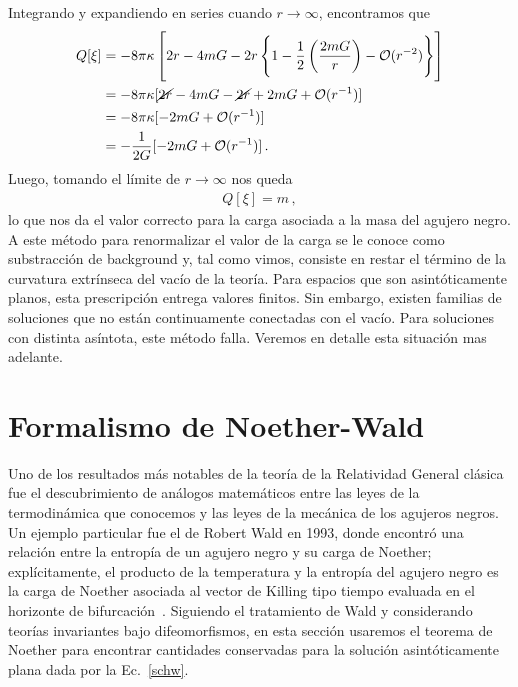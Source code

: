\documentclass[../Main.tex]{subfiles}
\begin{document}
Integrando y expandiendo en series cuando $r\to\infty$, encontramos que
\begin{align} \notag
    Q[\xi]&=-8\pi\kappa\left[2r-4mG-2r\left\{1-\frac{1}{2}\left(\frac{2mG}{r}\right)-\mathcal{O}(r^{-2})\right\}\right]\\ \notag
    &=-8\pi\kappa[\cancel{2r}-4mG-\cancel{2r}+2mG+\mathcal{O}(r^{-1})]\\ \notag
    &=-8\pi\kappa[-2mG+\mathcal{O}(r^{-1})]\\
    &=-\frac{1}{2G}[-2mG+\mathcal{O}(r^{-1})]\, .
\end{align}
Luego, tomando el límite de $r\to\infty$ nos queda 
\begin{align}
    Q[\xi]=m\, ,
\end{align}
lo que nos da el valor correcto para la carga asociada a la masa del agujero negro. A este método para renormalizar el valor de la carga se le conoce como substracción de background y, tal como vimos, consiste en restar el término de la curvatura extrínseca del vacío de la teoría. Para espacios que son asintóticamente planos, esta prescripción entrega valores finitos. Sin embargo, existen familias de soluciones que no están continuamente conectadas con el vacío. Para soluciones con distinta asíntota, este método falla. Veremos en detalle esta situación mas adelante. 

\section{Formalismo de Noether-Wald \label{sec:NW}}

Uno de los resultados más notables de la teoría de la Relatividad General clásica fue el descubrimiento de análogos matemáticos entre las leyes de la termodinámica que conocemos y las leyes de la mecánica de los agujeros negros. Un ejemplo particular fue el de Robert Wald en 1993, donde encontró una relación entre la entropía  de un agujero negro y su carga de Noether; explícitamente, el producto de la temperatura y la entropía del agujero negro es la carga de Noether asociada al vector de Killing tipo tiempo evaluada en el horizonte de bifurcación~\cite{Wald:1993nt}. Siguiendo el tratamiento de Wald y considerando teorías invariantes bajo difeomorfismos, en esta sección usaremos el teorema de Noether para encontrar cantidades conservadas para la solución asintóticamente plana dada por la Ec.~\eqref{schw}.
\end{document}
